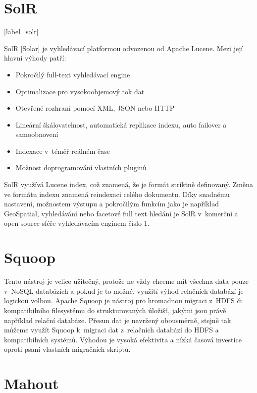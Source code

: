\section{SolR}[label=solr]

SolR [Solar] je vyhledávací platformou odvozenou od Apache Lucene. Mezi její hlavní výhody patří:

\begin{itemize}
\item Pokročilý full-text vyhledávací engine
\item Optimalizace pro vysokoobjemový tok dat
\item Otevřené rozhraní pomocí XML, JSON nebo HTTP
\item Lineární škálovatelnost, automatická replikace indexu, auto failover a samoobnovení
\item Indexace v~téměř reálném čase
\item Možnost doprogramování vlastních pluginů
\end{itemize}

SolR využívá Lucene index, což znamená, že je formát striktně definovaný. Změna ve formátu indexu znamená reindexaci celého dokumentu. Díky snadnému nastavení, možnostem výstupu a pokročilým funkcím jako je například GeoSpatial, vyhledávání nebo facetové full text hledání je SolR v~komerční a open source sféře vyhledávacím enginem číslo 1.


\section{Squoop}

Tento nástroj je velice užitečný, protože ne vždy chceme mít všechna data pouze v~NoSQL databázích a pokud je to možné, využití výhod relačních databází je logickou volbou. Apache Squoop je nástroj pro hromadnou migraci z~HDFS či kompatibilního filesystému do strukturovaných úložišť, jakými jsou právě například relační databáze. Přesun dat je navržený obousměrně, stejně tak můžeme využít Squoop k~migraci dat z~relačních databází do HDFS a kompatibilních systémů. Výhodou je vysoká efektivita a nízká časová investice oproti psaní vlastních migračních skriptů.

\section{Mahout}

